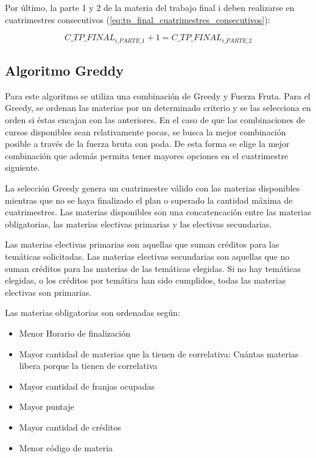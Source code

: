 \documentclass[a4paper]{article}
\begin{document}
Por último, la parte 1 y 2 de la materia del trabajo final i deben realizarse en cuatrimestres consecutivos (\ref{eq:tp_final_cuatrimestres_consecutivos}):

\begin{equation}\label{eq:tp_final_cuatrimestres_consecutivos}
C\_TP\_FINAL_{i\_PARTE\_1} + 1 = C\_TP\_FINAL_{i\_PARTE\_2}
\end{equation}


\subsection{Algoritmo Greddy}

Para este algoritmo se utiliza una combinación de Greedy y Fuerza Fruta. Para el Greedy, se ordenan las materias por un determinado criterio y se las selecciona en orden si éstas encajan con las anteriores. En el caso de que las combinaciones de cursos disponibles sean relativamente pocas, se busca la mejor combinación posible a través de la fuerza bruta con poda. De esta forma se elige la mejor combinación que además permita tener mayores opciones en el cuatrimestre siguiente.\newline

La selección Greedy genera un cuatrimestre válido con las materias disponibles mientras que no se haya finalizado el plan o superado la cantidad máxima de cuatrimestres. Las materias disponibles son una concatencación entre las materias obligatorias, las materias electivas primarias y las electivas secundarias.

Las materias electivas primarias son aquellas que suman créditos para las temáticas solicitadas. Las materias electivas secundarias son aquellas que no suman créditos para las materias de las temáticas elegidas. Si no hay temáticas elegidas, o los créditos por temática han sido cumplidos, todas las materias electivas son primarias.\newline

Las materias obligatorias son ordenadas según:

\begin{itemize}
	\item Menor Horario de finalización
    \item Mayor cantidad de materias que la tienen de correlativa: Cuántas materias libera porque la tienen de correlativa
	\item Mayor cantidad de franjas ocupadas
	\item Mayor puntaje
	\item Mayor cantidad de créditos
	\item Menor código de materia
\end{itemize}
\end{document}
